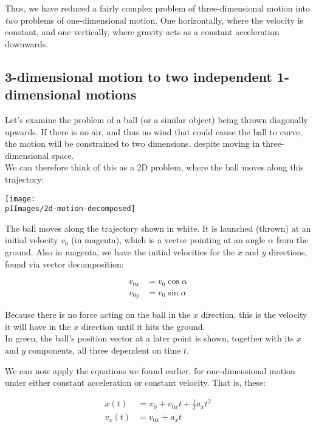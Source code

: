Thus, we have reduced a fairly complex problem of three-dimensional motion into \emph{two} problems of one-dimensional motion. One horizontally, where the velocity is constant, and one vertically, where gravity acts as a constant acceleration downwards.

\newpage

\subsection{3-dimensional motion to two independent 1-dimensional motions}

Let's examine the problem of a ball (or a similar object) being thrown diagonally upwards. If there is no air, and thus no wind that could cause the ball to curve, the motion will be constrained to two dimensions, despite moving in three-dimensional space.\\
We can therefore think of this as a 2D problem, where the ball moves along this trajectory:

\begin{center}
\texttt{[image: \\pIImages/2d-motion-decomposed]}
\end{center}

The ball moves along the trajectory shown in white. It is launched (thrown) at an initial velocity $v_0$ (in magenta), which is a vector pointing at an angle $\alpha$ from the ground. Also in magenta, we have the initial velocities for the $x$ and $y$ directions, found via vector decomposition:

\begin{align}
v_{0x} &= v_0 \cos \alpha\\
v_{0y} &= v_0 \sin \alpha
\end{align}

Because there is no force acting on the ball in the $x$ direction, this is the velocity it will have in the $x$ direction until it hits the ground.\\
In green, the ball's position vector at a later point is shown, together with its $x$ and $y$ components, all three dependent on time $t$.

We can now apply the equations we found earlier, for one-dimensional motion under either constant acceleration or constant velocity. That is, these:

\begin{align}
x(t) &= x_0 + v_{0x} t + \frac{1}{2} a_x t^2\\
v_x(t) &= v_{0x} + a_x t
\end{align}

